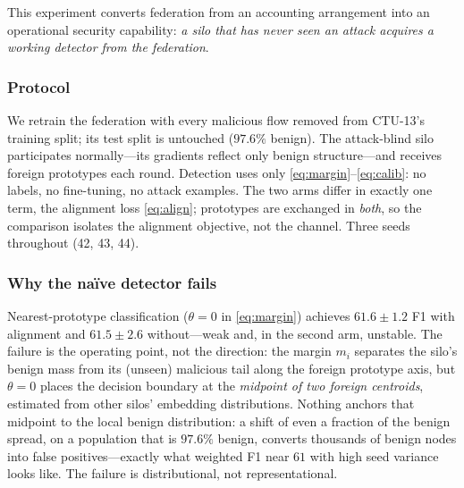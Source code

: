 \documentclass[journal]{IEEEtran}
\begin{document}
This experiment converts federation from an accounting arrangement
into an operational security capability: \emph{a silo that has never
seen an
attack acquires a working detector from the federation}.

\subsubsection{Protocol}
We retrain the federation with every malicious flow removed from
CTU-13's training split; its test split is untouched ($97.6\%$
benign). The attack-blind silo participates normally---its gradients
reflect only benign structure---and receives foreign prototypes each
round. Detection uses only \eqref{eq:margin}--\eqref{eq:calib}: no labels, no
fine-tuning, no attack examples. The two arms differ in exactly one
term, the alignment loss \eqref{eq:align}; prototypes are exchanged in
\emph{both}, so the comparison isolates the alignment objective, not
the channel. Three seeds throughout (42, 43, 44).

\subsubsection{Why the na\"ive detector fails}
Nearest-prototype classification ($\theta{=}0$ in \eqref{eq:margin})
achieves $61.6 \pm 1.2$ F1 with alignment and $61.5 \pm 2.6$
without---weak and, in the second arm, unstable. The failure is the
operating point, not the direction: the margin $m_i$ separates the
silo's benign mass from its (unseen) malicious tail along the foreign
prototype axis, but $\theta{=}0$ places the decision boundary at the
\emph{midpoint of two foreign centroids}, estimated from other silos'
embedding distributions. Nothing anchors that midpoint to the local
benign distribution: a shift of even a fraction of the benign spread,
on a population that is $97.6\%$ benign, converts thousands of benign
nodes into false positives---exactly what weighted F1 near $61$ with
high seed variance looks like. The failure is distributional, not
representational.
\end{document}
